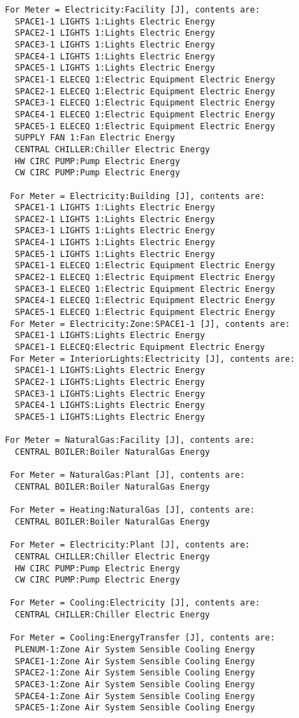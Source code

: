 \begin{lstlisting}
For Meter = Electricity:Facility [J], contents are:
  SPACE1-1 LIGHTS 1:Lights Electric Energy
  SPACE2-1 LIGHTS 1:Lights Electric Energy
  SPACE3-1 LIGHTS 1:Lights Electric Energy
  SPACE4-1 LIGHTS 1:Lights Electric Energy
  SPACE5-1 LIGHTS 1:Lights Electric Energy
  SPACE1-1 ELECEQ 1:Electric Equipment Electric Energy
  SPACE2-1 ELECEQ 1:Electric Equipment Electric Energy
  SPACE3-1 ELECEQ 1:Electric Equipment Electric Energy
  SPACE4-1 ELECEQ 1:Electric Equipment Electric Energy
  SPACE5-1 ELECEQ 1:Electric Equipment Electric Energy
  SUPPLY FAN 1:Fan Electric Energy
  CENTRAL CHILLER:Chiller Electric Energy
  HW CIRC PUMP:Pump Electric Energy
  CW CIRC PUMP:Pump Electric Energy

 For Meter = Electricity:Building [J], contents are:
  SPACE1-1 LIGHTS 1:Lights Electric Energy
  SPACE2-1 LIGHTS 1:Lights Electric Energy
  SPACE3-1 LIGHTS 1:Lights Electric Energy
  SPACE4-1 LIGHTS 1:Lights Electric Energy
  SPACE5-1 LIGHTS 1:Lights Electric Energy
  SPACE1-1 ELECEQ 1:Electric Equipment Electric Energy
  SPACE2-1 ELECEQ 1:Electric Equipment Electric Energy
  SPACE3-1 ELECEQ 1:Electric Equipment Electric Energy
  SPACE4-1 ELECEQ 1:Electric Equipment Electric Energy
  SPACE5-1 ELECEQ 1:Electric Equipment Electric Energy
 For Meter = Electricity:Zone:SPACE1-1 [J], contents are:
  SPACE1-1 LIGHTS:Lights Electric Energy
  SPACE1-1 ELECEQ:Electric Equipment Electric Energy
 For Meter = InteriorLights:Electricity [J], contents are:
  SPACE1-1 LIGHTS:Lights Electric Energy
  SPACE2-1 LIGHTS:Lights Electric Energy
  SPACE3-1 LIGHTS:Lights Electric Energy
  SPACE4-1 LIGHTS:Lights Electric Energy
  SPACE5-1 LIGHTS:Lights Electric Energy

For Meter = NaturalGas:Facility [J], contents are:
  CENTRAL BOILER:Boiler NaturalGas Energy

 For Meter = NaturalGas:Plant [J], contents are:
  CENTRAL BOILER:Boiler NaturalGas Energy

 For Meter = Heating:NaturalGas [J], contents are:
  CENTRAL BOILER:Boiler NaturalGas Energy

 For Meter = Electricity:Plant [J], contents are:
  CENTRAL CHILLER:Chiller Electric Energy
  HW CIRC PUMP:Pump Electric Energy
  CW CIRC PUMP:Pump Electric Energy

 For Meter = Cooling:Electricity [J], contents are:
  CENTRAL CHILLER:Chiller Electric Energy

 For Meter = Cooling:EnergyTransfer [J], contents are:
  PLENUM-1:Zone Air System Sensible Cooling Energy
  SPACE1-1:Zone Air System Sensible Cooling Energy
  SPACE2-1:Zone Air System Sensible Cooling Energy
  SPACE3-1:Zone Air System Sensible Cooling Energy
  SPACE4-1:Zone Air System Sensible Cooling Energy
  SPACE5-1:Zone Air System Sensible Cooling Energy
\end{lstlisting}


